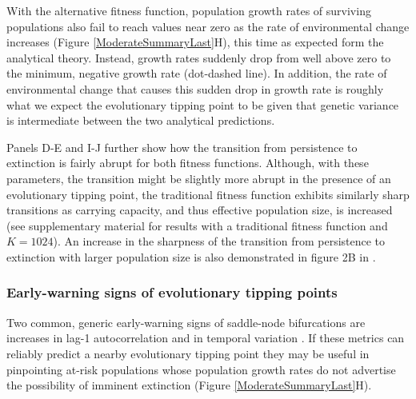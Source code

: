 \documentclass[12pt,letterpaper]{article} %
\begin{document}
With the alternative fitness function, population growth rates of surviving populations also fail to reach values near zero as the rate of environmental change increases (Figure \ref{ModerateSummaryLast}H), this time as expected form the analytical theory.
Instead, growth rates suddenly drop from well above zero to the minimum, negative growth rate (dot-dashed line).
In addition, the rate of environmental change that causes this sudden drop in growth rate is roughly what we expect the evolutionary tipping point to be given that genetic variance is intermediate between the two analytical predictions.

Panels D-E and I-J further show how the transition from persistence to extinction is fairly abrupt for both fitness functions.
Although, with these parameters, the transition might be slightly more abrupt in the presence of an evolutionary tipping point, the traditional fitness function exhibits similarly sharp transitions as carrying capacity, and thus effective population size, is increased (see supplementary material for results with a traditional fitness function and $K=1024$).
An increase in the sharpness of the transition from persistence to extinction with larger population size is also demonstrated in figure 2B in \cite{Burger1995}.


\subsubsection*{Early-warning signs of evolutionary tipping points}

Two common, generic early-warning signs of saddle-node bifurcations are increases in lag-1 autocorrelation and in temporal variation \citep{Scheffer2009,Lenton2011}.
If these metrics can reliably predict a nearby evolutionary tipping point they may be useful in pinpointing at-risk populations whose population growth rates do not advertise the possibility of imminent extinction (Figure \ref{ModerateSummaryLast}H).
\end{document}
